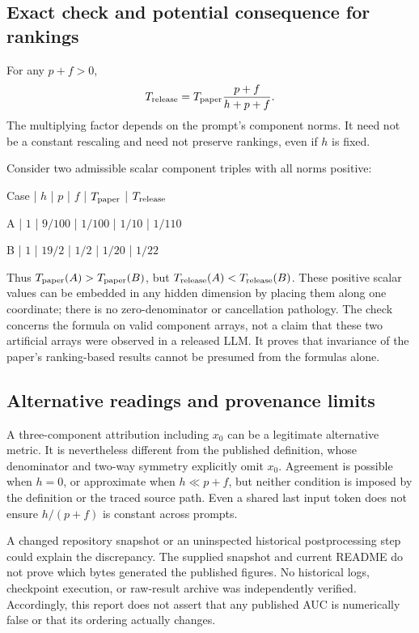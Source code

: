 \documentclass[10pt]{article}
\begin{document}
\subsection*{Exact check and potential consequence for rankings}
For any \(p+f>0\), \[T_{\rm release}=T_{\rm paper}\frac{p+f}{h+p+f}.\] The multiplying factor depends on the prompt’s component norms. It need not be a constant rescaling and need not preserve rankings, even if \(h\) is fixed.\par
Consider two admissible scalar component triples with all norms positive:\par
Case | \(h\) | \(p\) | \(f\) | \(T_{\rm paper}\) | \(T_{\rm release}\)\par
A | \(1\) | \(9/100\) | \(1/100\) | \(1/10\) | \(1/110\)\par
B | \(1\) | \(19/2\) | \(1/2\) | \(1/20\) | \(1/22\)\par
Thus \(T_{\rm paper}(A)>T_{\rm paper}(B)\), but \(T_{\rm release}(A)<T_{\rm release}(B)\). These positive scalar values can be embedded in any hidden dimension by placing them along one coordinate; there is no zero-denominator or cancellation pathology. The check concerns the formula on valid component arrays, not a claim that these two artificial arrays were observed in a released LLM. It proves that invariance of the paper’s ranking-based results cannot be presumed from the formulas alone.\par
\subsection*{Alternative readings and provenance limits}
A three-component attribution including \(x_0\) can be a legitimate alternative metric. It is nevertheless different from the published definition, whose denominator and two-way symmetry explicitly omit \(x_0\). Agreement is possible when \(h=0\), or approximate when \(h\ll p+f\), but neither condition is imposed by the definition or the traced source path. Even a shared last input token does not ensure \(h/(p+f)\) is constant across prompts.\par
A changed repository snapshot or an uninspected historical postprocessing step could explain the discrepancy. The supplied snapshot and current README do not prove which bytes generated the published figures. No historical logs, checkpoint execution, or raw-result archive was independently verified. Accordingly, this report does not assert that any published AUC is numerically false or that its ordering actually changes.\par
\end{document}
